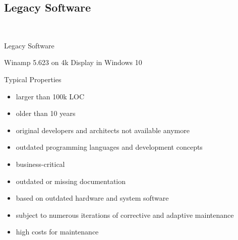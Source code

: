 \subsection{Legacy Software}
\begin{frame}{\insertsubsection\ }
	\begin{fancycolumns}
		\begin{definition}{Legacy Software \mysource{\ludewiglichter}}
		\end{definition}
		\begin{exampletight}{Winamp 5.623 on 4k Display in Windows 10}
		\end{exampletight}
		\nextcolumn
		\begin{note}{Typical Properties \mysource{\ludewiglichter}}
			\begin{itemize}
				\item larger than 100k LOC
				\item older than 10 years
				\item original developers and architects not available anymore
				\item outdated programming languages and development concepts
				\item business-critical
				\item outdated or missing documentation
				\item based on outdated hardware and system software
				\item subject to numerous iterations of corrective and adaptive maintenance
				\item high costs for maintenance
			\end{itemize}
		\end{note}
	\end{fancycolumns}
\end{frame}


